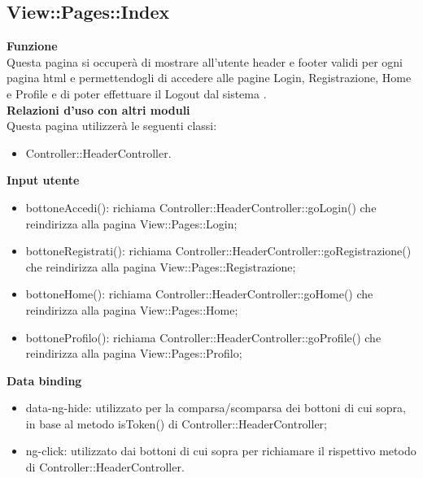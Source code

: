 {\subsection{View::Pages::Index}{
	\textbf{Funzione}\\
		\indent Questa pagina si occuperà di mostrare all'utente header e footer validi per ogni pagina html e permettendogli di accedere alle pagine Login, Registrazione, Home e Profile e di poter effettuare il Logout dal sistema .\\
	\textbf{Relazioni d'uso con altri moduli}\\
		\indent Questa pagina utilizzerà le seguenti classi:
	\begin{itemize}
		\item Controller::HeaderController.
	\end{itemize}
	\textbf{Input utente}
	\begin{itemize}
		\item bottoneAccedi(): richiama Controller::HeaderController::goLogin() che reindirizza alla pagina View::Pages::Login;
		\item bottoneRegistrati(): richiama Controller::HeaderController::goRegistrazione() che reindirizza alla pagina View::Pages::Registrazione;
		\item bottoneHome(): richiama Controller::HeaderController::goHome() che reindirizza alla pagina View::Pages::Home;
		\item bottoneProfilo(): richiama Controller::HeaderController::goProfile() che reindirizza alla pagina View::Pages::Profilo;
	\end{itemize}
	\textbf{Data binding}
	\begin{itemize}
		\item data-ng-hide: utilizzato per la comparsa/scomparsa dei bottoni di cui sopra, in base al metodo isToken() di Controller::\-HeaderController;
		\item ng-click: utilizzato dai bottoni di cui sopra per richiamare il rispettivo metodo di Controller::HeaderController.
	\end{itemize}
	}
}
